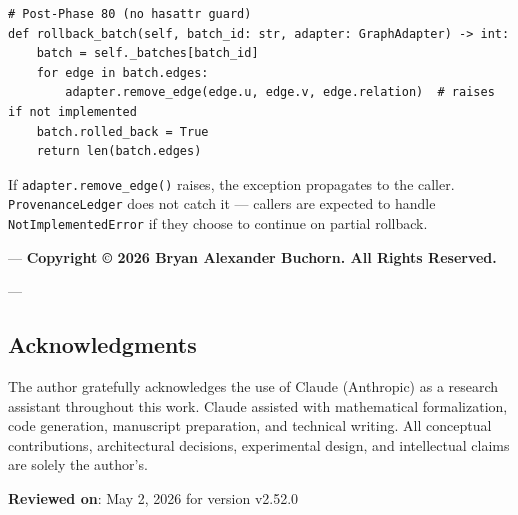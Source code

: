 \begin{lstlisting}
# Post-Phase 80 (no hasattr guard)
def rollback_batch(self, batch_id: str, adapter: GraphAdapter) -> int:
    batch = self._batches[batch_id]
    for edge in batch.edges:
        adapter.remove_edge(edge.u, edge.v, edge.relation)  # raises if not implemented
    batch.rolled_back = True
    return len(batch.edges)
\end{lstlisting}

If \texttt{adapter.remove\_edge()} raises, the exception propagates to the caller. \texttt{ProvenanceLedger} does not catch it — callers are expected to handle \texttt{NotImplementedError} if they choose to continue on partial rollback.

---
\textbf{Copyright © 2026 Bryan Alexander Buchorn. All Rights Reserved.}

---
\subsection{Acknow\-ledgments}

The author gratefully ackno\-wledges the use of Claude (Anthropic) as a research assistant throughout this work. Claude assisted with mathe\-matical forma\-lization, code generation, manuscript preparation, and technical writing. All conceptual contr\-ibutions, archi\-tectural decisions, exper\-imental design, and intel\-lectual claims are solely the author's.

\textbf{Reviewed on}: May 2, 2026 for version v2.52.0
